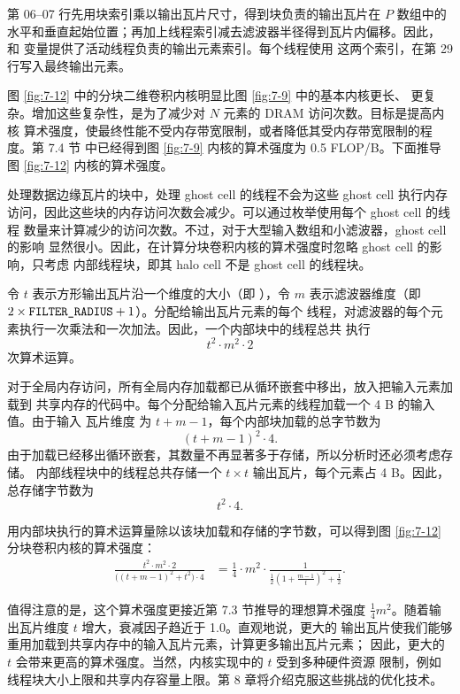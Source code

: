 第 06–07 行先用块索引乘以输出瓦片尺寸，得到块负责的输出瓦片在 $P$ 数组中的
水平和垂直起始位置；再加上线程索引减去滤波器半径得到瓦片内偏移。因此，
 和  变量提供了活动线程负责的输出元素索引。每个线程使用
这两个索引，在第 29 行写入最终输出元素。

图 \ref{fig:7-12} 中的分块二维卷积内核明显比图 \ref{fig:7-9} 中的基本内核更长、
更复杂。增加这些复杂性，是为了减少对 $N$ 元素的 DRAM 访问次数。目标是提高内核
算术强度，使最终性能不受内存带宽限制，或者降低其受内存带宽限制的程度。第 7.4 节
中已经得到图 \ref{fig:7-9} 内核的算术强度为 0.5 FLOP/B。下面推导图
\ref{fig:7-12} 内核的算术强度。

处理数据边缘瓦片的块中，处理 ghost cell 的线程不会为这些 ghost cell 执行内存
访问，因此这些块的内存访问次数会减少。可以通过枚举使用每个 ghost cell 的线程
数量来计算减少的访问次数。不过，对于大型输入数组和小滤波器，ghost cell 的影响
显然很小。因此，在计算分块卷积内核的算术强度时忽略 ghost cell 的影响，只考虑
内部线程块，即其 halo cell 不是 ghost cell 的线程块。

令 $t$ 表示方形输出瓦片沿一个维度的大小（即 ），令 $m$
表示滤波器维度（即 $2\times\code{FILTER_RADIUS}+1$）。分配给输出瓦片元素的每个
线程，对滤波器的每个元素执行一次乘法和一次加法。因此，一个内部块中的线程总共
执行
\[
  t^2\cdot m^2\cdot2
\]
次算术运算。

对于全局内存访问，所有全局内存加载都已从循环嵌套中移出，放入把输入元素加载到
共享内存的代码中。每个分配给输入瓦片元素的线程加载一个 4 B 的输入值。由于输入
瓦片维度  为 $t+m-1$，每个内部块加载的总字节数为
\[
  (t+m-1)^2\cdot4.
\]
由于加载已经移出循环嵌套，其数量不再显著多于存储，所以分析时还必须考虑存储。
内部线程块中的线程总共存储一个 $t\times t$ 输出瓦片，每个元素占 4 B。因此，
总存储字节数为
\[
  t^2\cdot4.
\]

用内部块执行的算术运算量除以该块加载和存储的字节数，可以得到图
\ref{fig:7-12} 分块卷积内核的算术强度：
\[
\begin{aligned}
  \frac{t^2\cdot m^2\cdot2}
  {\bigl((t+m-1)^2+t^2\bigr)\cdot4}
  &=
  \frac14\cdot m^2\cdot
  \frac{1}{\frac12\left(1+\frac{m-1}{t}\right)^2+\frac12}.
\end{aligned}
\]

值得注意的是，这个算术强度更接近第 7.3 节推导的理想算术强度
$\frac14m^2$。随着输出瓦片维度 $t$ 增大，衰减因子趋近于 1.0。直观地说，更大的
输出瓦片使我们能够重用加载到共享内存中的输入瓦片元素，计算更多输出瓦片元素；
因此，更大的 $t$ 会带来更高的算术强度。当然，内核实现中的 $t$ 受到多种硬件资源
限制，例如线程块大小上限和共享内存容量上限。第 8 章将介绍克服这些挑战的优化技术。

